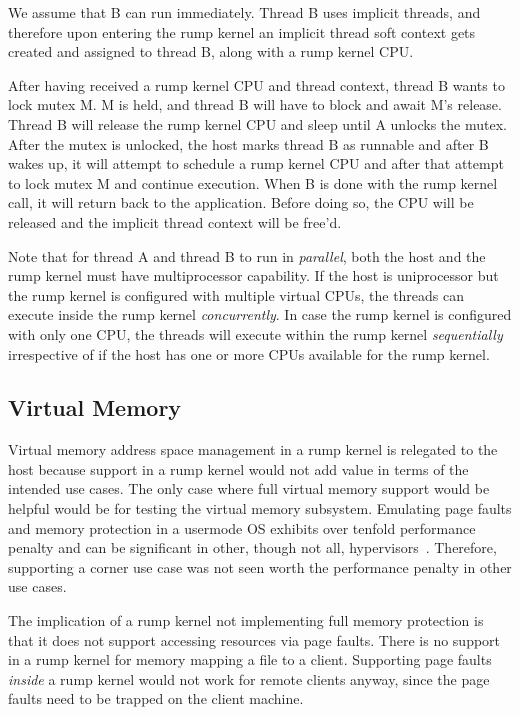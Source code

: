 We assume that B can run immediately.  Thread B uses implicit threads, and
therefore upon entering the rump kernel an implicit thread soft context
gets created and assigned to thread B, along with a rump kernel CPU.

After having received a rump kernel CPU and thread context, thread B
wants to lock mutex M.  M is held, and thread B will have to block and
await M's release.  Thread B will release the rump kernel CPU and sleep
until A unlocks the mutex.  After the mutex
is unlocked, the host marks thread B as runnable and after B wakes up,
it will attempt to schedule a rump kernel CPU and after that attempt
to lock mutex M and continue execution.  When B is done with the rump
kernel call, it will return back to the application.  Before doing so,
the CPU will be released and the implicit thread context will be free'd.

Note that for thread A and thread B to run in \textit{parallel}, both
the host and the rump kernel must have multiprocessor capability.
If the host is uniprocessor but the rump kernel is configured with
multiple virtual CPUs, the threads can execute inside the rump
kernel \textit{concurrently}.  In case the rump kernel is configured
with only one CPU, the threads will execute within the rump kernel
\textit{sequentially} irrespective of if the host has one or more CPUs
available for the rump kernel.

\subsection{Virtual Memory}
\label{sect:vmconcept}

Virtual memory address space management in a rump kernel is relegated
to the host because support in a rump kernel would
not add value in terms of the intended use cases.  The only case
where full virtual memory support would be helpful would be for
testing the virtual memory subsystem.  Emulating page faults and
memory protection in a usermode OS exhibits over tenfold performance
penalty and can be significant in other, though not all,
hypervisors~\cite{barham:xen}.  Therefore, supporting a corner use
case was not seen worth the performance penalty in other use cases.

The implication of a rump kernel not implementing full memory
protection is that it does not support accessing resources via page
faults.  There is no support in a rump kernel for memory mapping a file
to a client.  Supporting page faults \textit{inside} a rump kernel would
not work for remote clients anyway, since the page faults need to be
trapped on the client machine.

